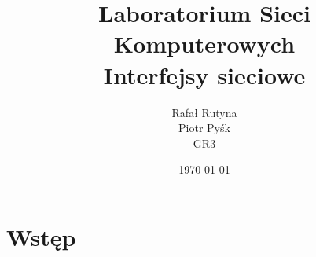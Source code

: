 \documentclass[a4paper,11pt,notitlepage]{article}
\author{Rafał Rutyna \\ Piotr Pyśk \\ GR3}
\title{Laboratorium Sieci Komputerowych \\ {\small Interfejsy sieciowe}}
\date{\today}
\begin{document}
\maketitle
\newpage
\tableofcontents
\newpage

\section{Wstęp}
\end{document}
